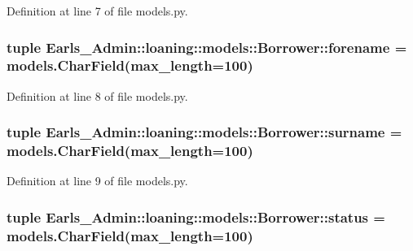 Definition at line 7 of file models.py.\hypertarget{classEarls__Admin_1_1loaning_1_1models_1_1Borrower_d258c5bbe73c92acbd2a0a8806457fc8}{
\subsubsection[forename]{\setlength{\rightskip}{0pt plus 5cm}tuple {\bf Earls\_\-Admin::loaning::models::Borrower::forename} = models.CharField(max\_\-length=100)}}
\label{classEarls__Admin_1_1loaning_1_1models_1_1Borrower_d258c5bbe73c92acbd2a0a8806457fc8}




Definition at line 8 of file models.py.\hypertarget{classEarls__Admin_1_1loaning_1_1models_1_1Borrower_85e368de3519118913eba46b822518f2}{
\subsubsection[surname]{\setlength{\rightskip}{0pt plus 5cm}tuple {\bf Earls\_\-Admin::loaning::models::Borrower::surname} = models.CharField(max\_\-length=100)}}
\label{classEarls__Admin_1_1loaning_1_1models_1_1Borrower_85e368de3519118913eba46b822518f2}




Definition at line 9 of file models.py.\hypertarget{classEarls__Admin_1_1loaning_1_1models_1_1Borrower_939baa46ff1cda6fcffd2ae9ba9c6f70}{
\subsubsection[status]{\setlength{\rightskip}{0pt plus 5cm}tuple {\bf Earls\_\-Admin::loaning::models::Borrower::status} = models.CharField(max\_\-length=100)}}
\label{classEarls__Admin_1_1loaning_1_1models_1_1Borrower_939baa46ff1cda6fcffd2ae9ba9c6f70}




